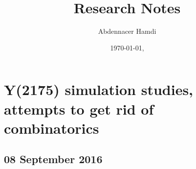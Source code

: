 \documentclass[a4paper]{article}
\title{Research Notes}
\author{Abdennacer Hamdi}
\date{\today, \currenttime}
\begin{document}
\maketitle
\tableofcontents
\listoffigures
\clearpage


\section{Y(2175) simulation studies, attempts to get rid of combinatorics}

\subsection{08 September 2016}
\end{document}

